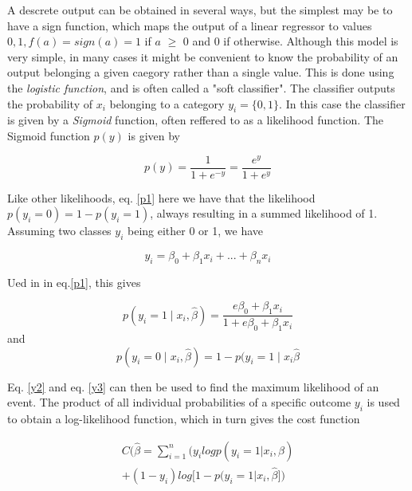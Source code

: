 \documentclass[a4paper,11pt,twocolumn]{article}
\begin{document}
A descrete output can be obtained in several ways, but the simplest may be to have a sign function, which maps the output of a linear regressor to values ${0,1}, f(a)=sign(a) = 1$ if $a$ $\geq$ 0 and 0 if otherwise.  Although this model is very simple, in many cases it might be convenient to know the probability of an output belonging a given caegory rather than a single value. This is done using the \textit{logistic function}, and is often called a "soft classifier".  The classifier outputs the probability of $x_i$ belonging to a category $y_i=\{0,1\}$. In this case the classifier is given by a \textit{Sigmoid} function, often reffered to as a likelihood function. The Sigmoid function $p(y)$ is given by\cite{slides}

\begin{equation}
p(y) = \frac{1}{1+e^{-y}}  = \frac{e^y}{1+e^y}
\label{p1}
\end{equation}

Like other likelihoods,  eq. \eqref{p1} here we have that the likelihood  $p(y_i = 0) = 1-p(y_i = 1) $, always resulting in a summed likelihood of 1. Assuming two classes $y_i$  being either 0 or 1, we have

\begin{equation}
\label{y1}
y_i=\beta_0+\beta_1x_i+...+\beta_nx_i
\end{equation}

Ued in in eq.\eqref{p1}, this gives 

\begin{equation}
\label{y2}
p(y_i=1\mid x_i,\hat{\beta}) = \frac{e{\beta_0+\beta_1x_i}}{1+e{\beta_0+\beta_1x_i}}
\end{equation}
and 
\begin{equation}
\label{y3}
p(y_i=0\mid x_i,\hat{\beta}) = 1 - p(y_i=1\mid x_i\hat{\beta}
\end{equation}

Eq. \eqref{y2} and eq. \eqref{y3} can then be used to find the maximum likelihood of an event. The product of all individual probabilities of a specific outcome $y_i$ is used to obtain a log-likelihood function, which in turn gives the cost function 

\begin{equation*}
\begin{aligned}
C(\hat{\beta}=\sum\limits_{i=1}^{n}\big(y_i log p(y_i=1\vert x_i,\hat{\beta})\\ 
+(1-y_i)log\big[1-p(y_i=1\vert x_i,\hat{\beta}\big]\big)
\end{aligned}
\label{c1}
\end{equation*}
\end{document}
